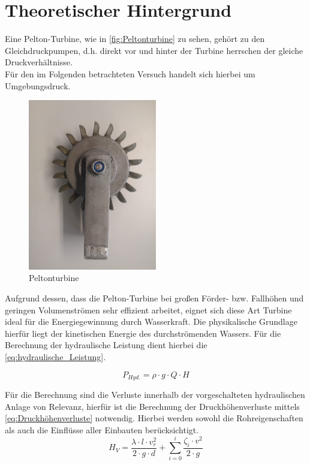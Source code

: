 \section{Theoretischer Hintergrund}
Eine Pelton-Turbine, wie in \autoref{fig:Peltonturbine} zu sehen, gehört zu den Gleichdruckpumpen, d.h. direkt vor und hinter der Turbine herrschen der gleiche Druckverhältnisse.\\
Für den im Folgenden betrachteten Versuch handelt sich hierbei um Umgebungsdruck.\\
\begin{figure}[H]
    \centering
    \includegraphics[width=0.5\textwidth]{Abbildungen/Peltonturbine.jpeg}
    \caption{Peltonturbine}
    \label{fig:Peltonturbine}
\end{figure}

Aufgrund dessen, dass die Pelton-Turbine bei großen Förder- bzw. Fallhöhen und geringen Volumenströmen sehr effizient arbeitet,
eignet sich diese Art Turbine ideal für die Energiegewinnung durch Wasserkraft.
Die physikalische Grundlage hierfür liegt der kinetischen Energie des durchströmenden Wassers.
Für die Berechnung der hydraulische Leistung dient hierbei die \autoref{eq:hydraulische_Leistung}.

\begin{equation}
    P_{Hyd.} = \rho \cdot g \cdot Q \cdot H
    \label{eq:hydraulische_Leistung}
  \end{equation}

Für die Berechnung sind die Verluste innerhalb der vorgeschalteten hydraulischen Anlage von Relevanz,
hierfür ist die Berechnung der Druckhöhenverluste mittels \autoref{eq:Druckhöhenverluste} notwendig.
Hierbei werden sowohl die Rohreigenschaften als auch die Einflüsse aller Einbauten berücksichtigt.
\begin{equation}
    H_{V} = \frac{\lambda \cdot l \cdot v_{r}^2}{2 \cdot g \cdot d} + \sum_{i=0}^{i} \frac{\zeta_{i} \cdot v^2}{2 \cdot g}
    \label{eq:Druckhöhenverluste}
\end{equation}

